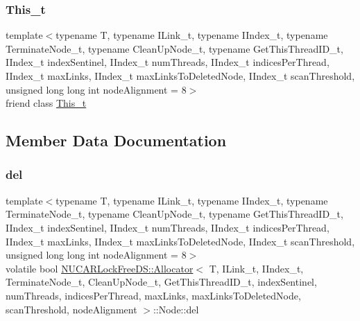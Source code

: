 \subsubsection{\texorpdfstring{This\+\_\+t}{This\_t}}
{\footnotesize\ttfamily template$<$typename T, typename I\+Link\+\_\+t, typename I\+Index\+\_\+t, typename Terminate\+Node\+\_\+t, typename Clean\+Up\+Node\+\_\+t, typename Get\+This\+Thread\+I\+D\+\_\+t, I\+Index\+\_\+t index\+Sentinel, I\+Index\+\_\+t num\+Threads, I\+Index\+\_\+t indices\+Per\+Thread, I\+Index\+\_\+t max\+Links, I\+Index\+\_\+t max\+Links\+To\+Deleted\+Node, I\+Index\+\_\+t scan\+Threshold, unsigned long long int node\+Alignment = 8$>$ \\
friend class \mbox{\hyperlink{class_n_u_c_a_r_lock_free_d_s_1_1_allocator_aa7636b4884545094b9532cc295604b17}{This\+\_\+t}}\hspace{0.3cm}{\ttfamily [friend]}}



\subsection{Member Data Documentation}
\mbox{\label{class_n_u_c_a_r_lock_free_d_s_1_1_allocator_1_1_node_ab5fd866eb1405eb7c5962f7842d6f546}} 
\subsubsection{\texorpdfstring{del}{del}}
{\footnotesize\ttfamily template$<$typename T, typename I\+Link\+\_\+t, typename I\+Index\+\_\+t, typename Terminate\+Node\+\_\+t, typename Clean\+Up\+Node\+\_\+t, typename Get\+This\+Thread\+I\+D\+\_\+t, I\+Index\+\_\+t index\+Sentinel, I\+Index\+\_\+t num\+Threads, I\+Index\+\_\+t indices\+Per\+Thread, I\+Index\+\_\+t max\+Links, I\+Index\+\_\+t max\+Links\+To\+Deleted\+Node, I\+Index\+\_\+t scan\+Threshold, unsigned long long int node\+Alignment = 8$>$ \\
volatile bool \mbox{\hyperlink{class_n_u_c_a_r_lock_free_d_s_1_1_allocator}{N\+U\+C\+A\+R\+Lock\+Free\+D\+S\+::\+Allocator}}$<$ T, I\+Link\+\_\+t, I\+Index\+\_\+t, Terminate\+Node\+\_\+t, Clean\+Up\+Node\+\_\+t, Get\+This\+Thread\+I\+D\+\_\+t, index\+Sentinel, num\+Threads, indices\+Per\+Thread, max\+Links, max\+Links\+To\+Deleted\+Node, scan\+Threshold, node\+Alignment $>$\+::Node\+::del\hspace{0.3cm}{\ttfamily [private]}}

